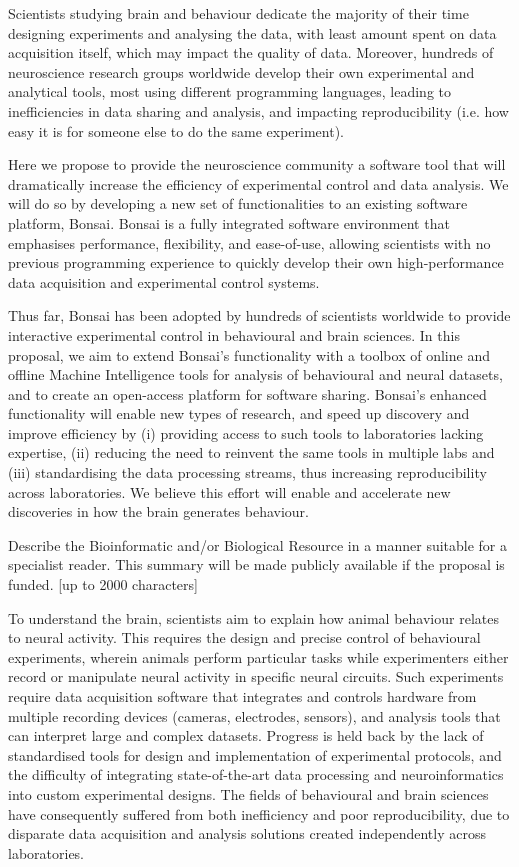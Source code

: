Scientists studying brain and behaviour dedicate the majority of their time designing experiments and analysing the data, with least amount spent on data acquisition itself, which may impact the quality of data. Moreover, hundreds of neuroscience research groups worldwide develop their own experimental and analytical tools, most using different programming languages, leading to  inefficiencies in data sharing and analysis, and impacting reproducibility (i.e. how easy it is for someone else to do the same experiment). 

Here we propose to provide the neuroscience community a software tool that will dramatically increase the efficiency of experimental control and data analysis. We will do so by developing a new set of functionalities to an existing software platform, Bonsai. Bonsai is a fully integrated software environment that emphasises performance, flexibility, and ease-of-use, allowing scientists with no previous programming experience to quickly develop their own high-performance data acquisition and experimental control systems.

Thus far, Bonsai has been adopted by hundreds of scientists worldwide to provide interactive experimental control in behavioural and brain sciences. In this proposal, we aim to extend Bonsai’s functionality with a toolbox of online and offline Machine Intelligence tools for analysis of behavioural and neural datasets, and to create an open-access platform for software sharing. Bonsai’s enhanced functionality will enable new types of research, and speed up discovery and improve efficiency by (i) providing access to such tools to laboratories lacking expertise, (ii) reducing the need to reinvent the same tools in multiple labs and (iii) standardising the data processing streams, thus increasing reproducibility across laboratories. We believe this effort will enable and accelerate new discoveries in how the brain generates behaviour. 



Describe the Bioinformatic and/or Biological Resource in a manner suitable for a specialist reader. This summary will be made publicly available if the proposal is funded. [up to 2000 characters]

To understand the brain, scientists aim to explain how animal behaviour relates to neural activity. This requires the design and precise control of behavioural experiments, wherein animals perform particular tasks while experimenters either record or manipulate neural activity in specific neural circuits. Such experiments require data acquisition software that integrates and controls hardware from multiple recording devices (cameras, electrodes, sensors), and analysis tools that can interpret large and complex datasets. Progress is held back by the lack of standardised tools for design and implementation of experimental protocols, and the difficulty of integrating state-of-the-art data processing and neuroinformatics into custom experimental designs. The fields of behavioural and brain sciences have consequently suffered from both inefficiency and poor reproducibility, due to disparate data acquisition and analysis solutions created independently across laboratories.   

